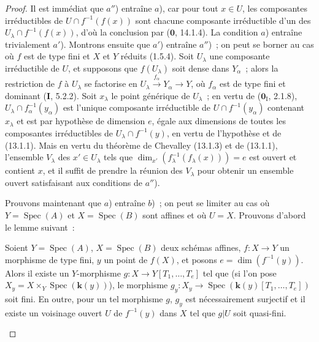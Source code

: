 \begin{proof}
Il est immédiat que $a''$) entraîne $a$), car pour tout $x\in U$, les
composantes irréductibles de $U\cap f^{-1}(f(x))$ sont chacune composante
irréductible d'un des $U_\lambda\cap f^{-1}(f(x))$, d'où la conclusion par
($\mathbf 0$, 14.1.4). La condition $a$) entraîne trivialement $a'$).
Montrons ensuite que $a'$) entraîne $a''$)~; on peut se borner au cas où $f$
est de type fini et $X$ et $Y$ réduits (1.5.4). Soit $U_\lambda$ une
composante irréductible de $U$, et supposons que $f(U_\lambda)$ soit dense
dans $Y_\alpha$~; alors la restriction de $f$ à $U_\lambda$ se factorise en
$U_\lambda\xrightarrow{f_\alpha}Y_\alpha\to Y$, où $f_\alpha$ est de type
fini et dominant (\textbf{I}, 5.2.2). Soit $x_\lambda$ le point générique de
$U_\lambda$~; en vertu de ($\mathbf 0_{\mathrm I}$, 2.1.8),
$U_\lambda\cap f_\alpha^{-1}(y_\alpha)$ est l'unique composante irréductible
de $U\cap f^{-1}(y_\alpha)$ contenant $x_\lambda$ et est par hypothèse de
dimension $e$, égale aux dimensions de toutes les composantes irréductibles
de $U_\lambda\cap f^{-1}(y)$, en vertu de l'hypothèse et de (13.1.1). Mais en
vertu du théorème de Chevalley (13.1.3) et de (13.1.1), l'ensemble $V_\lambda$
des $x'\in U_\lambda$ tels que
$\dim_{x'}(f_\lambda^{-1}(f_\lambda(x)))=e$ est ouvert et contient $x$, et il
suffit de prendre la réunion des $V_\lambda$ pour obtenir un ensemble ouvert
satisfaisant aux conditions de $a''$).

Prouvons maintenant que $a$) entraîne $b$)~; on peut se limiter au cas où
$Y=\operatorname{Spec}(A)$ et $X=\operatorname{Spec}(B)$ sont affines et où
$U=X$. Prouvons d'abord le lemme suivant~:

\begin{lemma}[13.3.1.1]
\label{IV.13.3.1.1-fr}
Soient $Y=\operatorname{Spec}(A)$, $X=\operatorname{Spec}(B)$ deux schémas
affines, $f:X\to Y$ un morphisme de type fini, $y$ un point de $f(X)$, et
posons $e=\dim(f^{-1}(y))$. Alors il existe un $Y$-morphisme
$g:X\to Y[T_1,\ldots,T_e]$ tel que (si l'on pose
$X_y=X\times_Y\operatorname{Spec}(\boldsymbol{k}(y))$), le morphisme
$g_y:X_y\to\operatorname{Spec}(\boldsymbol{k}(y)[T_1,\ldots,T_e])$ soit fini. En outre,
pour un tel morphisme $g$, $g_y$ est nécessairement surjectif et il existe un
voisinage ouvert $U$ de $f^{-1}(y)$ dans $X$ tel que $g|U$ soit quasi-fini.
\end{lemma}


\end{proof}
